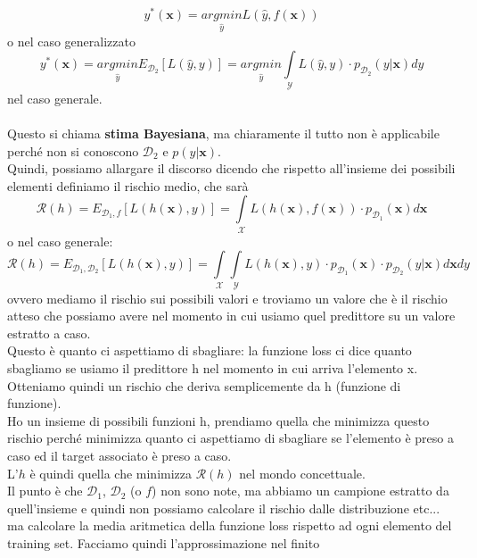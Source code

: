 \documentclass[12pt, oneside]{extbook}
\begin{document}
\begin{equation}
	y^*(\boldsymbol{x}) = \underset{\hat{y}}{argmin}L(\hat{y}, f(\boldsymbol{x}))
\end{equation}
o nel caso generalizzato
\begin{equation}
	y^*(\boldsymbol{x}) = \underset{\hat{y}}{argmin} E_{\mathscr{D}_2}[L(\hat{y}, y)] = \underset{\hat{y}}{argmin} \int\limits_{\mathscr{Y}} L(\hat{y},y) \cdot p_{\mathscr{D}_2}(y | \boldsymbol{x})dy
\end{equation} nel caso generale.\\\\
Questo si chiama \textbf{stima Bayesiana}, ma chiaramente il tutto non è applicabile perché non si conoscono $\mathscr{D}_2$ e $p(y|\boldsymbol{x})$.\\Quindi, possiamo allargare il discorso dicendo che rispetto all'insieme dei possibili elementi definiamo il rischio medio, che sarà
\begin{equation}
	\mathscr{R}(h) = E_{\mathscr{D}_1,f}[L(h(\boldsymbol{x}), y)] = \int\limits_{\mathscr{X}} L(h(\boldsymbol{x}), f(\boldsymbol{x})) \cdot p_{\mathscr{D}_1}(\boldsymbol{x}) d\boldsymbol{x}
\end{equation}
o nel caso generale:
\begin{equation}
	\mathscr{R}(h) = E_{\mathscr{D}_1,\mathscr{D}_2}[L(h(\boldsymbol{x}), y)] = \int\limits_{\mathscr{X}}\int\limits_{\mathscr{Y}} L(h(\boldsymbol{x}), y) \cdot p_{\mathscr{D}_1}(\boldsymbol{x}) \cdot p_{\mathscr{D}_2}(y | \boldsymbol{x}) d\boldsymbol{x}dy
\end{equation}
ovvero mediamo il rischio sui possibili valori e troviamo un valore che è il rischio atteso che possiamo avere nel momento in cui usiamo quel predittore su un valore estratto a caso.\\Questo è quanto ci aspettiamo di sbagliare: la funzione loss ci dice quanto sbagliamo se usiamo il predittore h nel momento in cui arriva l'elemento x.\\Otteniamo quindi un rischio che deriva semplicemente da h (funzione di funzione).\\Ho un insieme di possibili funzioni h, prendiamo quella che minimizza questo rischio perché minimizza quanto ci aspettiamo di sbagliare se l'elemento è preso a caso ed il target associato è preso a caso.\\L'$h$ è quindi quella che minimizza $\mathscr{R}(h)$ nel mondo concettuale.\\Il punto è che $\mathscr{D}_1$, $\mathscr{D}_2$ (o $f$) non sono note, ma abbiamo un campione estratto da quell'insieme e quindi non possiamo calcolare il rischio dalle distribuzione etc... ma calcolare la media aritmetica della funzione loss rispetto ad ogni elemento del training set. Facciamo quindi l'approssimazione nel finito
\end{document}
